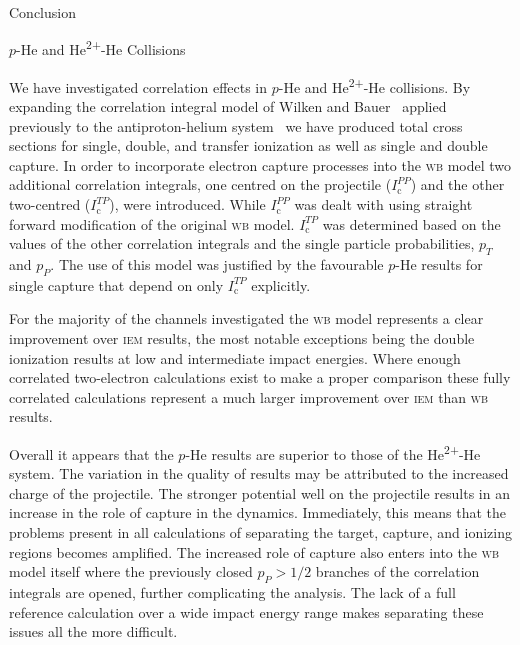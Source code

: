 \documentclass[letterpaper, 11 pt]{report}
\begin{document}
\begin{chapter}{Conclusion \label{chap:con}}

   \begin{section}{\texorpdfstring{$p$}{p}-He and \texorpdfstring{He\textsuperscript{2+}}{He2+}-He
                   Collisions \label{sec:con-phe2p-he}}

      We have investigated correlation effects in $p$-He and He\textsuperscript{2+}-He collisions. By
      expanding the correlation integral model of Wilken and Bauer~\cite{wb} applied previously to the
      antiproton-helium system~\cite{pbarhe} we have produced total cross sections for single, double,
      and transfer ionization as well as single and double capture. In order to incorporate electron
      capture processes into the \textsc{wb} model two additional correlation integrals, one centred on
      the projectile ($I^{PP}_\mathrm{c}$) and the other two-centred ($I^{TP}_\mathrm{c}$), were
      introduced. While $I^{PP}_\mathrm{c}$ was dealt with using straight forward modification of the
      original \textsc{wb} model. $I^{TP}_\mathrm{c}$ was determined based on the values of the other
      correlation integrals and the single particle probabilities, $p_T$ and $p_P$. The use of this
      model was justified by the favourable $p$-He results for single capture that depend on only
      $I^{TP}_\mathrm{c}$ explicitly.

      For the majority of the channels investigated the \textsc{wb} model represents a clear improvement
      over \textsc{iem}  results, the most notable exceptions being the double ionization results at low
      and intermediate impact energies. Where enough correlated two-electron calculations exist to make
      a proper comparison these fully correlated calculations represent a much larger improvement over
      \textsc{iem} than \textsc{wb} results.
  
      Overall it appears that the $p$-He results are superior to those of the He\textsuperscript{2+}-He
      system. The variation in the quality of results may be attributed to the increased charge of the
      projectile. The stronger potential well on the projectile results in an increase in the role of
      capture in the dynamics. Immediately, this means that the problems present in all calculations of
      separating the target, capture, and ionizing regions becomes amplified. The increased role of
      capture also enters into the \textsc{wb} model itself where the previously closed $p_P > 1/2$
      branches of the correlation integrals are opened, further complicating the analysis. The lack of a
      full reference calculation over a wide impact energy range makes separating these issues all the
      more difficult.


\end{section}
\end{chapter}
\end{document}
